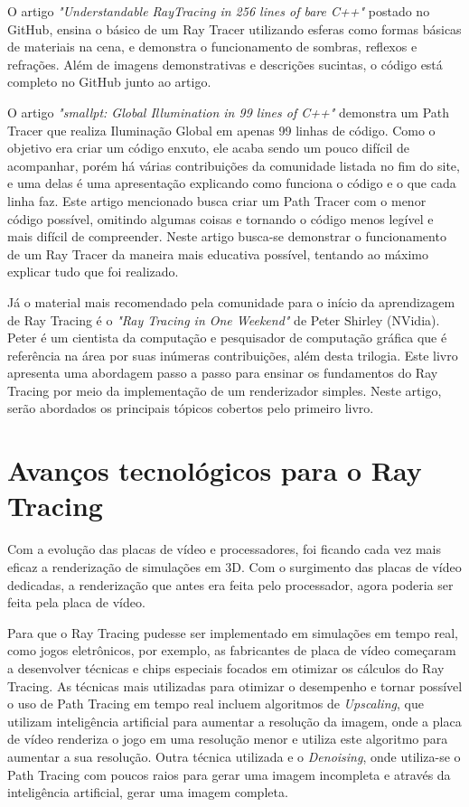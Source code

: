 \documentclass[journal]{IEEEtran}
\begin{document}
O artigo
\emph{"Understandable RayTracing in 256 lines of bare C++"}\cite{c14} postado no GitHub,
ensina o básico de um Ray Tracer utilizando esferas como formas básicas de materiais
na cena, e demonstra o funcionamento de sombras, reflexos e refrações. Além de imagens
demonstrativas e descrições sucintas, o código está completo no GitHub junto ao artigo.

O artigo \emph{"smallpt: Global Illumination in 99 lines of C++"} \cite{c13} demonstra 
um Path Tracer que realiza Iluminação Global em apenas 99 linhas de código. Como o 
objetivo era criar um código enxuto, ele acaba sendo um pouco difícil de acompanhar,
porém há várias contribuições da comunidade listada no fim do site, e uma delas é
uma apresentação explicando como funciona o código e o que cada linha faz. Este artigo
mencionado busca criar um Path Tracer com o menor código possível, omitindo algumas
coisas e tornando o código menos legível e mais difícil de compreender. Neste artigo
busca-se demonstrar o funcionamento de um Ray Tracer da maneira mais educativa possível,
tentando ao máximo explicar tudo que foi realizado.

Já o material mais recomendado pela comunidade para o início da aprendizagem de Ray Tracing
é o \emph{"Ray Tracing in One Weekend"} \cite{Shirley2020RTW1} de Peter Shirley (NVidia).
Peter é um cientista da computação e pesquisador de computação gráfica que é referência
na área por suas inúmeras contribuições\cite{shirley-curriculum}, além desta trilogia.
Este livro apresenta uma abordagem passo a passo para ensinar os fundamentos do Ray Tracing
por meio da implementação de um renderizador simples. Neste artigo, serão abordados
os principais tópicos cobertos pelo primeiro livro.

\section{Avanços tecnológicos para o Ray Tracing}
Com a evolução das placas de vídeo e processadores, foi ficando cada vez mais
eficaz a renderização de simulações em 3D. Com o surgimento das placas de vídeo
dedicadas, a renderização que antes era feita pelo processador, agora poderia
ser feita pela placa de vídeo.

Para que o Ray Tracing pudesse ser implementado em simulações em tempo real,
como jogos eletrônicos, por exemplo, as fabricantes de placa de vídeo começaram
a desenvolver técnicas e chips especiais focados em otimizar os cálculos do Ray 
Tracing. As técnicas mais utilizadas para otimizar o desempenho e tornar possível
o uso de Path Tracing em tempo real incluem algoritmos de \emph{Upscaling}, que 
utilizam inteligência artificial para aumentar a resolução da imagem, onde a 
placa de vídeo renderiza o jogo em uma resolução menor e utiliza este algoritmo
para aumentar a sua resolução. Outra técnica utilizada e o \emph{Denoising},
onde utiliza-se o Path Tracing com poucos raios para gerar uma imagem incompleta
e através da inteligência artificial, gerar uma imagem completa.
\end{document}
